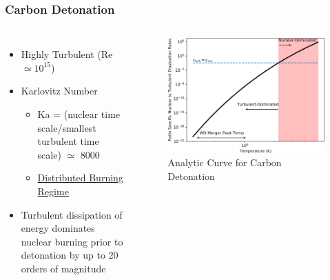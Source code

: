 \documentclass{beamer}
\begin{document}

\begin{frame}
\frametitle{Carbon Detonation}

\begin{columns}[c]
        \begin{itemize}
		\item Highly Turbulent (Re $\simeq 10^{15}$) 
                \item Karlovitz Number
			\begin{itemize}
				\item Ka = (nuclear time scale/smallest turbulent time scale) $\simeq$ 8000
				\item \underline{Distributed Burning Regime}
			\end{itemize}
		\item Turbulent dissipation of energy dominates nuclear burning prior to detonation by up to 20 orders of magnitude
        \end{itemize}


	\vspace{25pt}
        \begin{figure}
    \begin{center}
      \includegraphics[width=.90\linewidth]{carbon_enuc_ration.png}
            \caption{Analytic Curve for Carbon Detonation}
    \end{center}
  \end{figure}

        \end{columns}

\end{frame}
\end{document}
